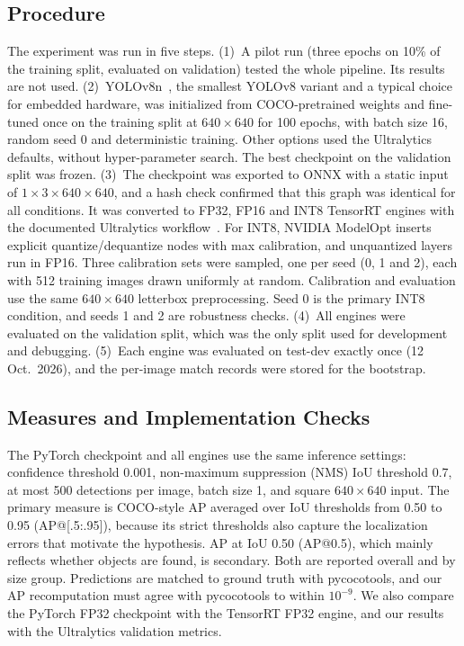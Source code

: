 \documentclass[conference]{IEEEtran}
\begin{document}
\subsection{Procedure}
The experiment was run in five steps.
(1)~A pilot run (three epochs on 10\% of the training split, evaluated on validation) tested the
whole pipeline. Its results are not used.
(2)~YOLOv8n~\cite{jocher2023yolov8}, the smallest YOLOv8 variant and a typical choice for
embedded hardware, was initialized from COCO-pretrained weights and fine-tuned once on the
training split at $640 \times 640$ for 100 epochs, with batch size 16, random seed 0 and
deterministic training. Other options used the Ultralytics defaults, without hyper-parameter
search. The best checkpoint on the validation split was frozen.
(3)~The checkpoint was exported to ONNX with a static input of $1 \times 3 \times 640 \times 640$,
and a hash check confirmed that this graph was identical for all conditions. It was converted to
FP32, FP16 and INT8 TensorRT engines with the documented Ultralytics
workflow~\cite{ultralytics_tensorrt}. For INT8, NVIDIA ModelOpt inserts explicit
quantize/dequantize nodes with max calibration, and unquantized layers run in FP16. Three
calibration sets were sampled, one per seed (0, 1 and 2), each with 512 training images drawn
uniformly at random. Calibration and evaluation use the same $640 \times 640$ letterbox
preprocessing. Seed 0 is the primary INT8 condition, and seeds 1 and 2 are robustness checks.
(4)~All engines were evaluated on the validation split, which was the only split used for
development and debugging.
(5)~Each engine was evaluated on test-dev exactly once (12 Oct.\ 2026), and the per-image match
records were stored for the bootstrap.

\subsection{Measures and Implementation Checks}
The PyTorch checkpoint and all engines use the same inference settings:
confidence threshold 0.001, non-maximum suppression (NMS) IoU threshold 0.7, at most 500
detections per image, batch size 1, and square $640 \times 640$ input. The primary measure is
COCO-style AP averaged over IoU thresholds from 0.50 to 0.95 (AP@[.5:.95]), because its strict
thresholds also capture the localization errors that motivate the hypothesis. AP at IoU 0.50
(AP@0.5), which mainly reflects whether objects are found, is secondary. Both are reported
overall and by size group. Predictions are matched to ground truth with pycocotools, and our AP
recomputation must agree with pycocotools to within $10^{-9}$. We also compare the PyTorch FP32
checkpoint with the TensorRT FP32 engine, and our results with the Ultralytics validation
metrics.
\end{document}
